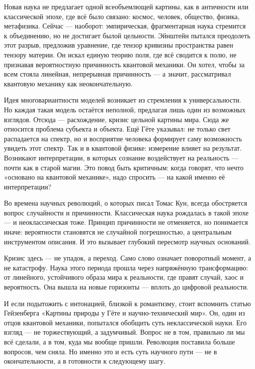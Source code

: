 Новая наука не предлагает одной всеобъемлющей картины, как в античности или классической эпохе, где всё было связано: космос, человек, общество, физика, метафизика. Сейчас --- наоборот: эмпирическая, фрагментарная наука стремится к объединению, но не достигает былой цельности. Эйнштейн пытался преодолеть этот разрыв, предложив уравнение, где тензор кривизны пространства равен тензору материи. Он искал единую теорию поля, где всё сводится к полю, не признавая вероятностную причинность квантовой механики. Он хотел, чтобы за всем стояла линейная, непрерывная причинность --- а значит, рассматривал квантовую механику как неокончательную.

Идея многовариантности моделей возникает из стремления к универсальности. Но каждая такая модель остаётся неполной, предлагая лишь один из возможных взглядов. Отсюда --- расхождение, кризис цельной картины мира. Сюда же относится проблема субъекта и объекта. Ещё Гёте указывал: не только свет распадается на спектр, но и восприятие человека формирует саму возможность увидеть этот спектр. Так и в квантовой физике: измерение влияет на результат. Возникают интерпретации, в которых сознание воздействует на реальность --- почти как в старой магии. Это повод быть критичным: когда говорят, что нечто «основано на квантовой механике», надо спросить --- на какой именно её интерпретации?

Во времена научных революций, о которых писал Томас Кун, всегда обостряется вопрос случайности и причинности. Классическая наука рождалась в такой эпохе --- и неоклассическая тоже. Принцип причинности не отменяется, но понимается иначе: вероятности становятся не случайной погрешностью, а центральным инструментом описания. И это вызывает глубокий пересмотр научных оснований.

Кризис здесь --- не упадок, а переход. Само слово означает поворотный момент, а не катастрофу. Наука этого периода прошла через напряжённую трансформацию: от линейного, устойчивого образа мира к реальности, где правят случай, хаос и вероятность. Она вышла на новые горизонты --- вплоть до цифровой реальности.

И если подытожить с интонацией, близкой к романтизму, стоит вспомнить статью Гейзенберга «Картины природы у Гёте и научно-технический мир». Он, один из отцов квантовой механики, попытался обобщить суть неклассической науки. Его взгляд --- не торжествующий, а задумчивый. Вопрос не в том, правильно ли мы всё сделали, а в том, куда мы вообще пришли. Революция поставила больше вопросов, чем сняла. Но именно это и есть суть научного пути --- не в окончательности, а в готовности к следующему шагу.